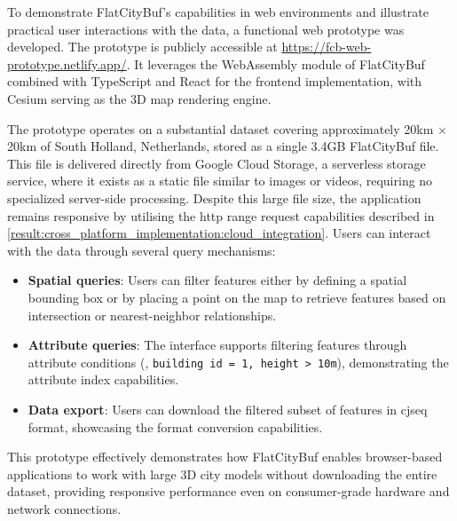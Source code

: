 To demonstrate FlatCityBuf's capabilities in web environments and illustrate practical user interactions with the data, a functional web prototype was developed. The prototype is publicly accessible at \url{https://fcb-web-prototype.netlify.app/}. It leverages the WebAssembly module of FlatCityBuf combined with TypeScript and React for the frontend implementation, with Cesium serving as the 3D map rendering engine.

The prototype operates on a substantial dataset covering approximately 20km $\times$ 20km of South Holland, Netherlands, stored as a single 3.4GB FlatCityBuf file. This file is delivered directly from Google Cloud Storage\citep{gcs}, a serverless storage service, where it exists as a static file similar to images or videos, requiring no specialized server-side processing. Despite this large file size, the application remains responsive by utilising the \ac{http} range request capabilities described in \autoref{result:cross_platform_implementation:cloud_integration}. Users can interact with the data through several query mechanisms:

\begin{itemize}
  \item \textbf{Spatial queries}: Users can filter features either by defining a spatial bounding box or by placing a point on the map to retrieve features based on intersection or nearest-neighbor relationships.

  \item \textbf{Attribute queries}: The interface supports filtering features through attribute conditions (\eg, \texttt{building id = 1, height > 10m}), demonstrating the attribute index capabilities.

  \item \textbf{Data export}: Users can download the filtered subset of features in \ac{cjseq} format, showcasing the format conversion capabilities.
\end{itemize}

This prototype effectively demonstrates how FlatCityBuf enables browser-based applications to work with large 3D city models without downloading the entire dataset, providing responsive performance even on consumer-grade hardware and network connections.

